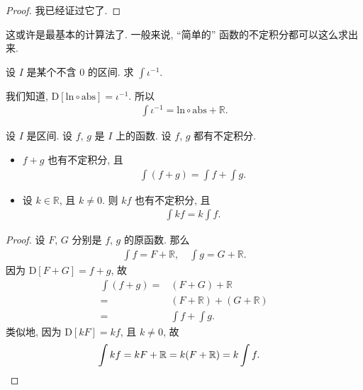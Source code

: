 \begin{proof}
    我已经证过它了.
\end{proof}

这或许是最基本的计算法了. 一般来说, ``简单的'' 函数的不定积分都可以这么求出来.

\begin{example}
    设 $I$ 是某个不含 $0$ 的区间. 求 $\int {\iota^{-1}}$.

    我们知道, $\mathrm{D}[\mathrm{ln} \circ \mathrm{abs}] = \iota^{-1}$. 所以
    \begin{align*}
        \int {\iota^{-1}} = \mathrm{ln} \circ \mathrm{abs} + \mathbb{R}.
    \end{align*}
\end{example}

\begin{theorem}
    设 $I$ 是区间. 设 $f$, $g$ 是 $I$ 上的函数. 设 $f$, $g$ 都有不定积分.
    \begin{itemize}
        \item $f + g$ 也有不定积分, 且
              \begin{align*}
                  \int {(f + g)} = \int {f} + \int {g}.
              \end{align*}
        \item 设 $k \in \mathbb{R}$, 且 $k \neq 0$. 则 $kf$ 也有不定积分, 且
              \begin{align*}
                  \int {kf} = k \int{f}.
              \end{align*}
    \end{itemize}
\end{theorem}

\begin{proof}
    设 $F$, $G$ 分别是 $f$, $g$ 的原函数. 那么
    \begin{align*}
        \int {f} = F + \mathbb{R}, \quad \int {g} = G + \mathbb{R}.
    \end{align*}
    因为 $\mathrm{D}[F + G] = f + g$, 故
    \begin{align*}
        \int {(f + g)}
        = {} & (F + G) + \mathbb{R}                \\
        = {} & (F + \mathbb{R}) + (G + \mathbb{R}) \\
        = {} & \int {f} + \int {g}.
    \end{align*}
    类似地, 因为 $\mathrm{D}[kF] = kf$, 且 $k \neq 0$, 故
    \begin{align*}
         & {\int {kf}} = kF + \mathbb{R} = k(F + \mathbb{R}) = k\int {f}. \qedhere
    \end{align*}
\end{proof}

